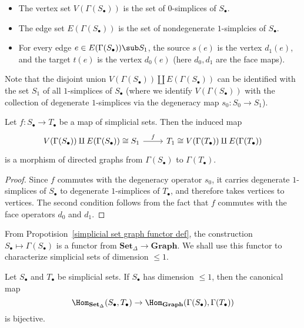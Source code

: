 \begin{itemize}
\item The vertex set $V(\Gamma(S_\bullet))$ is the set of $0$-simplices of $S_\bullet$.
\item The edge set $E(\Gamma(S_\bullet))$ is the set of nondegenerate $1$-simplcies of $S_\bullet$.
\item For every edge $e\in E(\Gamma(S_\bullet))\sub S_1$, the source $s(e)$ is the vertex $d_1(e)$, and the target $t(e)$ is the vertex $d_0(e)$ (here $d_0,d_1$ are the face maps).
\end{itemize}
Note that the disjoint union $V(\Gamma(S_\bullet))\amalg E(\Gamma(S_\bullet))$ can be identified with the set $S_1$ of all $1$-simplices of $S_\bullet$ (where we identify $V(\Gamma(S_\bullet))$ with the collection of degenerate $1$-simplices via the degeneracy map $s_0:S_0\to S_1$).
\begin{proposition}\label{simplicial set graph functor def}
Let $f:S_\bullet\to T_\bullet$ be a map of simplicial sets. Then the induced map
\[\begin{tikzcd}
V(\Gamma(S_\bullet))\amalg E(\Gamma(S_\bullet))\cong S_1\ar[r,"f"]&T_1\cong V(\Gamma(T_\bullet))\amalg E(\Gamma(T_\bullet))
\end{tikzcd}\]
is a morphism of directed graphs from $\Gamma(S_\bullet)$ to $\Gamma(T_\bullet)$.
\end{proposition}
\begin{proof}
Since $f$ commutes with the degeneracy operator $s_0$, it carries degenerate $1$-simplices of $S_\bullet$ to degenerate $1$-simplices of $T_\bullet$, and therefore takes vertices to vertices. The second condition follows from the fact that $f$ commutes with the face operators $d_0$ and $d_1$.
\end{proof}
From Propotision~\ref{simplicial set graph functor def}, the construction $S_\bullet\mapsto\Gamma(S_\bullet)$ is a functor from $\mathbf{Set}_\Delta\to\mathbf{Graph}$. We shall use this functor to characterize simplicial sets of dimension $\leq 1$.
\begin{proposition}\label{simplicial set graph functor on dim 1 faithful}
Let $S_\bullet$ and $T_\bullet$ be simplicial sets. If $S_\bullet$ has dimension $\leq 1$, then the canonical map
\[\Hom_{\mathbf{Set}_\Delta}(S_\bullet,T_\bullet)\to\Hom_{\mathbf{Graph}}(\Gamma(S_\bullet),\Gamma(T_\bullet))\]
is bijective.
\end{proposition}
